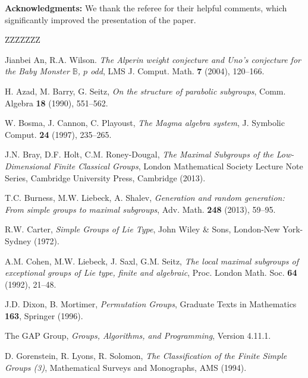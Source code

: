 \documentclass[11pt]{amsart}
\numberwithin{equation}{section}
\theoremstyle{definition}
\theoremstyle{remark}
\begin{document}
\vspace{0.3cm} \noindent
{\bfseries Acknowledgments:}
We thank the referee for their helpful comments,
which significantly improved the presentation of the paper.









\vspace{0.1cm}
\begin{thebibliography}{ZZZZZZZ} 

 Jianbei An, R.A. Wilson. 
\textit{The Alperin weight conjecture and Uno’s conjecture for the Baby
Monster $\mathbb{B}$, $p$ odd}, 
LMS J. Comput. Math. \textbf{7} (2004), 120--166.

 H. Azad, M. Barry, G. Seitz,
\textit{On the structure of parabolic subgroups},
Comm. Algebra \textbf{18} (1990), 551--562.

 W. Bosma, J. Cannon, C. Playoust, 
\textit{The Magma algebra system}, 
J. Symbolic Comput. \textbf{24} (1997), 235--265.

 J.N. Bray, D.F. Holt, C.M. Roney-Dougal,
\textit{The Maximal Subgroups of the Low-Dimensional Finite Classical Groups},
London Mathematical Society Lecture Note Series, Cambridge University Press, Cambridge (2013).

 T.C. Burness, M.W. Liebeck, A. Shalev,
\textit{Generation and random generation:
From simple groups to maximal subgroups},
Adv. Math. \textbf{248} (2013), 59--95.

 R.W. Carter,
\textit{Simple Groups of Lie Type},
John Wiley \& Sons, London-New York-Sydney (1972).

 A.M. Cohen, M.W. Liebeck, J. Saxl, G.M. Seitz, 
\textit{The local maximal subgroups of exceptional groups of Lie type, finite and algebraic},
Proc. London Math. Soc. \textbf{64} (1992), 21--48.

 J.D. Dixon, B. Mortimer,
\textit{Permutation Groups},
Graduate Texts in Mathematics \textbf{163}, Springer (1996).

 The GAP Group,
\textit{Groups, Algorithms, and Programming}, Version 4.11.1.

 D. Gorenstein, R. Lyons, R. Solomon,
\textit{The Classification of the Finite Simple Groups (3)},
Mathematical Surveys and Monographs, AMS (1994).


\end{thebibliography}
\end{document}

